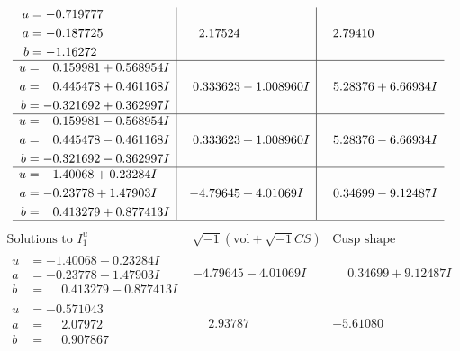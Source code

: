 \documentclass[1p]{elsarticle_modified}
\theoremstyle{definition}
\newcommand{\I}{\sqrt{-1}}
\begin{document}
$$\begin{array}{c|c|c}
\begin{aligned}
u &= -0.719777\phantom{ +0.000000I} \\
a &= -0.187725\phantom{ +0.000000I} \\
b &= -1.16272\phantom{ +0.000000I}\end{aligned}
 & \phantom{-}2.17524\phantom{ +0.000000I} & \phantom{-}2.79410\phantom{ +0.000000I} \\ \hline\begin{aligned}
u &= \phantom{-}0.159981 + 0.568954 I \\
a &= \phantom{-}0.445478 + 0.461168 I \\
b &= -0.321692 + 0.362997 I\end{aligned}
 & \phantom{-}0.333623 - 1.008960 I & \phantom{-}5.28376 + 6.66934 I \\ \hline\begin{aligned}
u &= \phantom{-}0.159981 - 0.568954 I \\
a &= \phantom{-}0.445478 - 0.461168 I \\
b &= -0.321692 - 0.362997 I\end{aligned}
 & \phantom{-}0.333623 + 1.008960 I & \phantom{-}5.28376 - 6.66934 I \\ \hline\begin{aligned}
u &= -1.40068 + 0.23284 I \\
a &= -0.23778 + 1.47903 I \\
b &= \phantom{-}0.413279 + 0.877413 I\end{aligned}
 & -4.79645 + 4.01069 I & \phantom{-}0.34699 - 9.12487 I\\
 \hline 
 \end{array}$$\newpage$$\begin{array}{c|c|c}  
\text{Solutions to }I^u_{1}& \I (\text{vol} + \sqrt{-1}CS) & \text{Cusp shape}\\
 \hline 
\begin{aligned}
u &= -1.40068 - 0.23284 I \\
a &= -0.23778 - 1.47903 I \\
b &= \phantom{-}0.413279 - 0.877413 I\end{aligned}
 & -4.79645 - 4.01069 I & \phantom{-}0.34699 + 9.12487 I \\ \hline\begin{aligned}
u &= -0.571043\phantom{ +0.000000I} \\
a &= \phantom{-}2.07972\phantom{ +0.000000I} \\
b &= \phantom{-}0.907867\phantom{ +0.000000I}\end{aligned}
 & \phantom{-}2.93787\phantom{ +0.000000I} & -5.61080\phantom{ +0.000000I} \\ \hline\begin{aligned}

\end{aligned}
\end{array}$$
\end{document}
